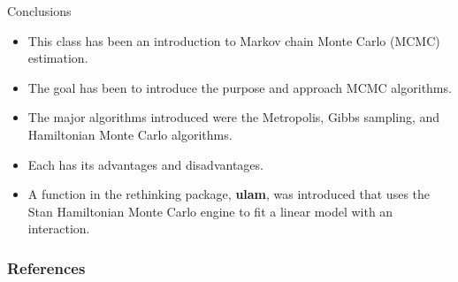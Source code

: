 \documentclass[handout]{beamer}
\begin{document}
\begin{frame}{Conclusions}
\scriptsize{

\begin{itemize}
\item This class has been an  introduction to Markov chain Monte Carlo (MCMC) estimation. 

\item The goal has been to introduce the purpose and approach MCMC algorithms.
\item The major algorithms introduced were the Metropolis, Gibbs sampling, and Hamiltonian
Monte Carlo algorithms.
\item Each has its advantages and disadvantages. 
\item A function in the rethinking package, \textbf{ulam}, was introduced that uses the Stan Hamiltonian Monte Carlo engine to fit a linear model with an interaction.
\end{itemize}


} 
\end{frame}


\begin{frame}[allowframebreaks]\scriptsize
\frametitle{References}


%
\end{frame}  









\end{document}
